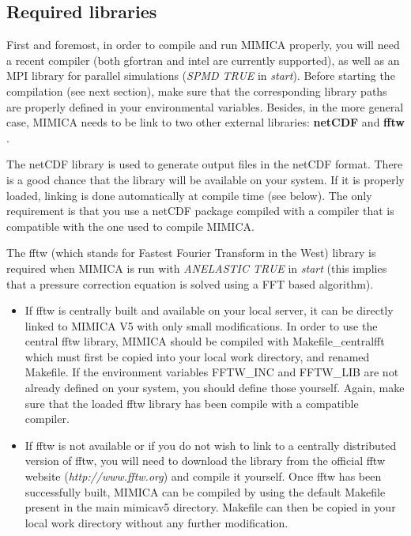 \documentclass[12pt,A4,french]{article}
\begin{document}
\subsection{Required libraries}

First and foremost, in order to compile and run MIMICA properly, you will need a recent compiler (both gfortran and intel are currently supported), as well as an MPI library for parallel simulations ({\it SPMD TRUE} in {\it start}). Before starting the compilation (see next section), make sure that the corresponding library paths are properly defined in your environmental variables. Besides, in the more general case, MIMICA needs to be link to two other external libraries: {\bf netCDF} \cite{NETCDF} and {\bf fftw} \cite{FFTW}. 

The netCDF library is used to generate output files in the netCDF format. There is a good chance that the library will be available on your system. If it is properly loaded, linking is done automatically at compile time (see below). The only requirement is that you use a netCDF package compiled with a compiler that is compatible with the one used to compile MIMICA.

The fftw (which stands for Fastest Fourier Transform in the West) library is required when MIMICA is run with {\it ANELASTIC TRUE} in {\it start} (this implies that a pressure correction equation is solved using a FFT based algorithm). 

\begin{itemize}
\item If fftw is centrally built and available on your local server, it can be directly linked to MIMICA V5 with only small modifications. In order to use the central fftw library, MIMICA should be compiled with Makefile\_centralfft which must first be copied into your local work directory, and renamed Makefile. If the  environment variables FFTW\_INC and FFTW\_LIB are not already defined on your system, you should define those yourself. Again, make sure that the loaded fftw library has been compile with a compatible compiler.

 \item If fftw is not available or if you do not wish to link to a centrally distributed version of fftw, you will need to download the library from the official fftw website ({\it http://www.fftw.org}) and compile it yourself. Once fftw has been successfully built, MIMICA can be compiled by using the default Makefile present in the main mimicav5 directory. Makefile can then be copied in your local work directory without any further modification.
 \end{itemize}
 
\end{document}

